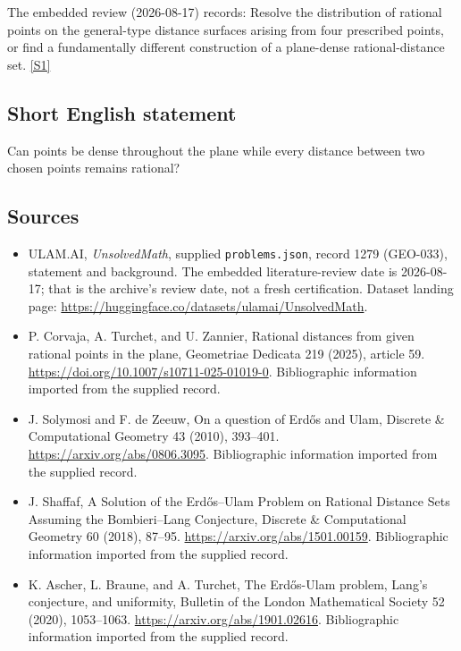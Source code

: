 \documentclass[11pt,a4paper]{article}
\newcommand{\sref}[2]{\hyperlink{source:#1:#2}{[S#2]}}
\begin{document}
The embedded review (2026-08-17) records: Resolve the distribution of rational points on the general-type distance surfaces arising from four prescribed points, or find a fundamentally different construction of a plane-dense rational-distance set. \sref{1279}{1}

\subsection{Short English statement}

Can points be dense throughout the plane while every distance between two chosen points remains rational?

\subsection{Sources}

{\small

\begin{itemize}

\item[\hypertarget{source:1279:1}{S1}] ULAM.AI, \emph{UnsolvedMath}, supplied \texttt{problems.json}, record 1279 (GEO-033), statement and background. The embedded literature-review date is 2026-08-17; that is the archive’s review date, not a fresh certification. Dataset landing page: \url{https://huggingface.co/datasets/ulamai/UnsolvedMath}.

\item[\hypertarget{source:1279:2}{S2}] P. Corvaja, A. Turchet, and U. Zannier, Rational distances from given rational points in the plane, Geometriae Dedicata 219 (2025), article 59. \url{https://doi.org/10.1007/s10711-025-01019-0}. Bibliographic information imported from the supplied record.

\item[\hypertarget{source:1279:3}{S3}] J. Solymosi and F. de Zeeuw, On a question of Erdős and Ulam, Discrete \& Computational Geometry 43 (2010), 393–401. \url{https://arxiv.org/abs/0806.3095}. Bibliographic information imported from the supplied record.

\item[\hypertarget{source:1279:4}{S4}] J. Shaffaf, A Solution of the Erdős–Ulam Problem on Rational Distance Sets Assuming the Bombieri–Lang Conjecture, Discrete \& Computational Geometry 60 (2018), 87–95. \url{https://arxiv.org/abs/1501.00159}. Bibliographic information imported from the supplied record.

\item[\hypertarget{source:1279:5}{S5}] K. Ascher, L. Braune, and A. Turchet, The Erdős-Ulam problem, Lang's conjecture, and uniformity, Bulletin of the London Mathematical Society 52 (2020), 1053–1063. \url{https://arxiv.org/abs/1901.02616}. Bibliographic information imported from the supplied record.

\end{itemize}

}

\label{end:1279}
\end{document}
